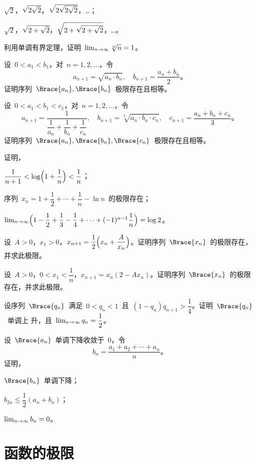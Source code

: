 \begin{exercise}
\begin{exlistcols}
  \item $\sqrt2$，$\smsqrt{2\sqrt2}$，$\sqrt{2\smsqrt{2\sqrt2}}$，\ldots ；
  \item $\sqrt2$，$\smsqrt{2+\sqrt2}$，$\sqrt{2+\smsqrt{2+\sqrt2}}$，\ldots 。
\end{exlistcols}
\item 利用单调有界定理，证明~$\lim_\ntoinf\sqrt[n]n=1$。
\item 设~$0<a_1<b_1$，对~$n=1,2,\dotsc$，令
\[
  a_{n+1}=\sqrt{a_n\cdot b_n},\quad b_{n+1}=\frac{a_n+b_n}2。
\]
证明序列~$\Brace{a_n},\Brace{b_n}$~极限存在且相等。
\item 设~$0<a_1<b_1<c_1$，对~$n=1,2,\dotsc$，令
\[
  a_{n+1}=\frac1{\dfrac1{a_n}+\dfrac1{b_n}+\dfrac1{c_n}},\quad
  b_{n+1}=\sqrt[3]{a_n\cdot b_n\cdot c_n},\quad
  c_{n+1}=\frac{a_n+b_n+c_n}3。
\]
证明序列~$\Brace{a_n},\Brace{b_n},\Brace{c_n}$~极限存在且相等。
\item 证明，
\begin{exlistcols}
  \item $\dfrac1{n+1}<\ln\Paren[\Big]{1+\dfrac1n}<\dfrac1n$；
  \item 序列~$x_n=1+\dfrac12+\dotsb+\dfrac1n-\ln n$~的极限存在；
  \item $\lim_\ntoinf\Paren[\Big]{1-\dfrac12+\dfrac13-\dfrac14+\dotsb+(-1)^{n-1}\dfrac1n}=\ln2$。
\end{exlistcols}
\item 设~$A>0$，$x_1>0$，$x_{n+1}=\dfrac12\Paren[\Big]{x_n+\dfrac A{x_n}}$。证明序列~$\Brace{x_n}$~的极限存在，并求此极限。
\item 设~$A>0$，$0<x_1<\dfrac1n$，$x_{n+1}=x_n(2-Ax_n)$。证明序列~$\Brace{x_n}$~的极限存在，并求此极限。
\item 设序列~$\Brace{q_n}$~满足~$0<q_n<1$~且~$(1-q_n)q_{n+1}>\dfrac14$。证明~$\Brace{q_n}$~单调上
升，且~$\lim_\ntoinf q_n=\dfrac12$。
\item 设~$\Brace{a_n}$~单调下降收敛于~$0$，令
\[
  b_n=\frac{a_1+a_2+\dotsb+a_n}n。
\]
证明，
\begin{exlistcols}[3]
  \item $\Brace{b_n}$~单调下降；
  \item $b_{2n}\leq\dfrac12(a_n+b_n)$；
  \item $\lim_\ntoinf b_n=0$。
\end{exlistcols}
\end{exercise}
\section{函数的极限}
\begin{exercise}
\item
\end{exercise}
